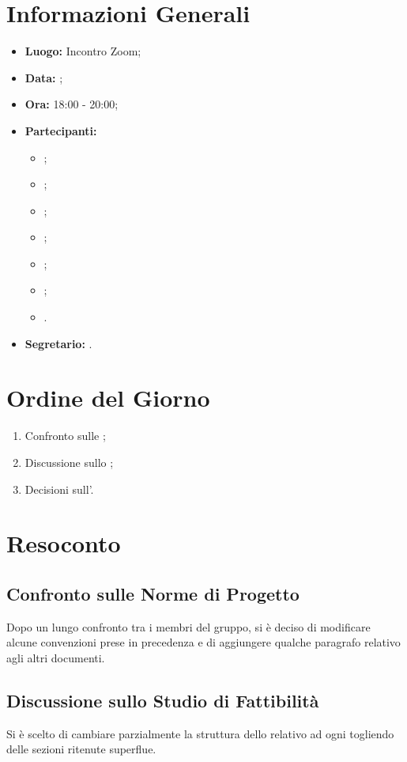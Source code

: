 \section{Informazioni Generali}
\begin{itemize}
\item \textbf{Luogo:} Incontro Zoom;
\item \textbf{Data:} \Data;
\item \textbf{Ora:} 18:00 - 20:00;
\item \textbf{Partecipanti:}
	\begin{itemize}
		\item \BL{}; 
		\item \FF{};
		\item \MM{}; 
		\item \PC{};
		\item \TG{};
		\item \TL{};
		\item \VD{}.
	\end{itemize} 
\item \textbf{Segretario:} \PC{}.
\end{itemize}

\section{Ordine del Giorno}
\begin{enumerate}
 \item Confronto sulle \NdP;
 \item Discussione sullo \SdF;
 \item Decisioni sull'\AdR.
\end{enumerate}

\section{Resoconto}
\subsection{Confronto sulle Norme di Progetto}
Dopo un lungo confronto tra i membri del gruppo, si è deciso di modificare alcune convenzioni prese in precedenza e di aggiungere qualche paragrafo relativo agli altri documenti.
\subsection{Discussione sullo Studio di Fattibilità}
Si è scelto di cambiare parzialmente la struttura dello \textit{\SdF} relativo ad ogni  togliendo delle sezioni ritenute superflue.
